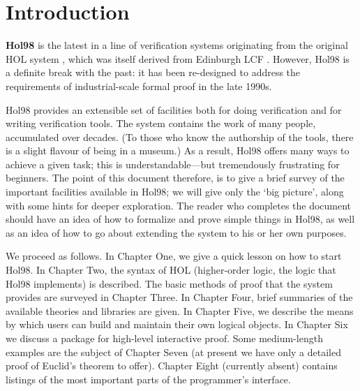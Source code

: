  \section*{Introduction}

 {\bf Hol98} is the latest in a line of verification systems originating
 from the original HOL system \cite{hol88:book}, which was itself
 derived from Edinburgh LCF \cite{lcf:book}. However, Hol98 is a
 definite break with the past: it has been re-designed to address the
 requirements of industrial-scale formal proof in the late 1990s.

 Hol98 provides an extensible set of facilities both for doing
 verification and for writing verification tools. The system contains the
 work of many people, accumulated over decades. (To those who know the
 authorship of the tools, there is a slight flavour of being in a
 museum.) As a result, Hol98 offers many ways to achieve a given task;
 this is understandable---but tremendously frustrating for beginners.
 The point of this document therefore, is to give a brief survey of the
 important facilities available in Hol98; we will give only the `big
 picture', along with some hints for deeper exploration. The reader who
 completes the document should have an idea of how to formalize and prove
 simple things in Hol98, as well as an idea of how to go about extending
 the system to his or her own purposes.

  We proceed as follows. In Chapter One, we give a quick lesson on how
 to start Hol98.  In Chapter Two, the syntax of HOL (higher-order logic,
 the logic that Hol98 implements) is described. The basic methods of
 proof that the system provides are surveyed in Chapter Three. In
 Chapter Four, brief summaries of the available theories and libraries
 are given. In Chapter Five, we describe the means by which users can
 build and maintain their own logical objects. In Chapter Six we discuss
 a package for high-level interactive proof. Some medium-length
 examples are the subject of Chapter Seven (at present we have only a
 detailed proof of Euclid's theorem to offer).  Chapter Eight (currently
 absent) contains listings of the most important parts of the
 programmer's interface.


